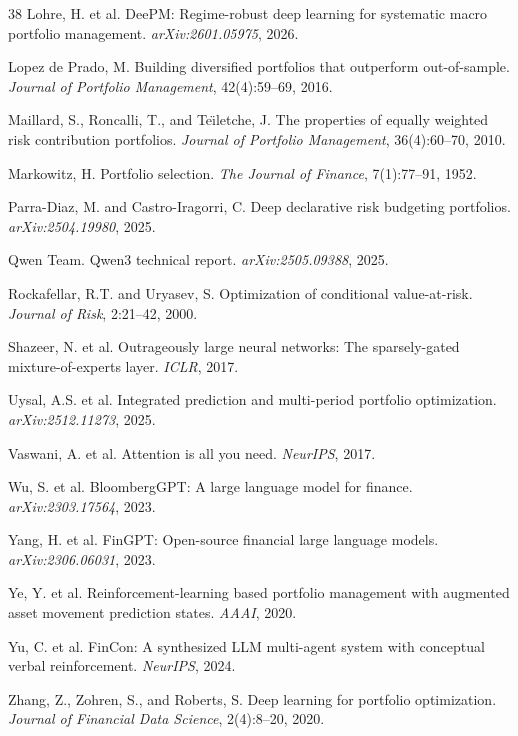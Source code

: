 \documentclass[11pt]{article}
\begin{document}
\begin{thebibliography}{38}
Lohre, H. et al.
\newblock DeePM: Regime-robust deep learning for systematic macro portfolio management.
\newblock \emph{arXiv:2601.05975}, 2026.

Lopez de Prado, M.
\newblock Building diversified portfolios that outperform out-of-sample.
\newblock \emph{Journal of Portfolio Management}, 42(4):59--69, 2016.

Maillard, S., Roncalli, T., and Te\"{\i}letche, J.
\newblock The properties of equally weighted risk contribution portfolios.
\newblock \emph{Journal of Portfolio Management}, 36(4):60--70, 2010.

Markowitz, H.
\newblock Portfolio selection.
\newblock \emph{The Journal of Finance}, 7(1):77--91, 1952.

Parra-Diaz, M. and Castro-Iragorri, C.
\newblock Deep declarative risk budgeting portfolios.
\newblock \emph{arXiv:2504.19980}, 2025.

Qwen Team.
\newblock Qwen3 technical report.
\newblock \emph{arXiv:2505.09388}, 2025.

Rockafellar, R.T. and Uryasev, S.
\newblock Optimization of conditional value-at-risk.
\newblock \emph{Journal of Risk}, 2:21--42, 2000.

Shazeer, N. et al.
\newblock Outrageously large neural networks: The sparsely-gated mixture-of-experts layer.
\newblock \emph{ICLR}, 2017.

Uysal, A.S. et al.
\newblock Integrated prediction and multi-period portfolio optimization.
\newblock \emph{arXiv:2512.11273}, 2025.

Vaswani, A. et al.
\newblock Attention is all you need.
\newblock \emph{NeurIPS}, 2017.

Wu, S. et al.
\newblock BloombergGPT: A large language model for finance.
\newblock \emph{arXiv:2303.17564}, 2023.

Yang, H. et al.
\newblock FinGPT: Open-source financial large language models.
\newblock \emph{arXiv:2306.06031}, 2023.

Ye, Y. et al.
\newblock Reinforcement-learning based portfolio management with augmented asset movement prediction states.
\newblock \emph{AAAI}, 2020.

Yu, C. et al.
\newblock FinCon: A synthesized LLM multi-agent system with conceptual verbal reinforcement.
\newblock \emph{NeurIPS}, 2024.

Zhang, Z., Zohren, S., and Roberts, S.
\newblock Deep learning for portfolio optimization.
\newblock \emph{Journal of Financial Data Science}, 2(4):8--20, 2020.

\end{thebibliography}
\end{document}
